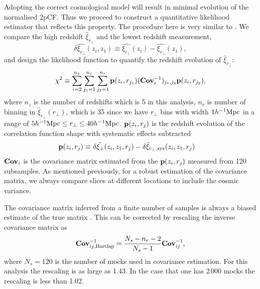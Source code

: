 \documentclass[iop]{emulateapj}
\begin{document}
Adopting the correct cosmological model will result in minimal evolution of the normalised 2pCF.
Thus we proceed to construct a quantitative likelihood estimator that reflects this property.
The procedure here is very similar to \cite{Li2014,Li2015,Li2016}.
We compare the high redshift $\hat\xi_{r_\perp}$ and the lowest redshift measurement,
\begin{equation}
 \delta \hat{\xi_{r_\perp}}(z_i,z_1) \equiv \hat{\xi_{r_\perp}}(z_i) - \hat{\xi_{r_\perp}}(z_1),
\end{equation}
and design the likelihood function to quantify
the redshift evolution of $\hat\xi_{r_\perp}$:
\begin{equation}\label{eq:chisq1}
\chi^2\equiv \sum_{i=2}^{n_{z}} \sum_{j_1=1}^{n_{r}} \sum_{j_2=1}^{n_{r}} {\bf p}(z_i,r_{j_1}) ({\bf Cov}_{i}^{-1})_{j_1,j_2}  {\bf p}(z_i,r_{j_2}),
\end{equation}
where $n_z$ is the number of redshifts which is 5 in this analysis, 
$n_r$ is number of binning in $\hat{\xi}_{r_\perp}(r_\perp)$,
which is 35 since we have $r_\perp$ bins 
with width $1h^{-1}\rm Mpc$ in a range of $5h^{-1}{\rm Mpc}\leq r_\perp\leq 40h^{-1}{\rm Mpc}$.
${\bf p}(z_i,r_{j})$ is the redshift evolution of the correlation function shape with systematic effects subtracted
\begin{eqnarray}\label{eq:bfp}
 {\bf p}(z_i,r_{j}) \equiv&\ \delta \hat{\xi_\perp}(z_i,z_1,r_j) - \delta \hat{\xi}_{r_\perp,\rm sys}(z_i,z_1,r_j)
\end{eqnarray}
${\bf Cov}_i$ is the covariance matrix estimated from the ${\bf p}(z_i,r_{j})$ measured from 120 subsamples.
As mentioned previously, for a robust estimation of the covariance matrix, 
we always compare slices at different locations to 
include the cosmic variance.

The covariance matrix inferred from a finite number of samples
is always a biased estimate of the true matrix \citep{Hartlap}.
This can be corrected by rescaling the inverse covariance matrix as 
\begin{equation}
 {\bf Cov}^{-1}_{ij,\rm Hartlap} = \frac{N_s - n_{r}-2}{N_s-1} {\bf Cov}^{-1}_{ij},
\end{equation}
where $N_s=120$ is the number of mocks used in covariance estimation.
For this analysis the rescaling is as large as 1.43.
In the case that one has 2\,000 mocks the rescaling is less than 1.02.
\end{document}
